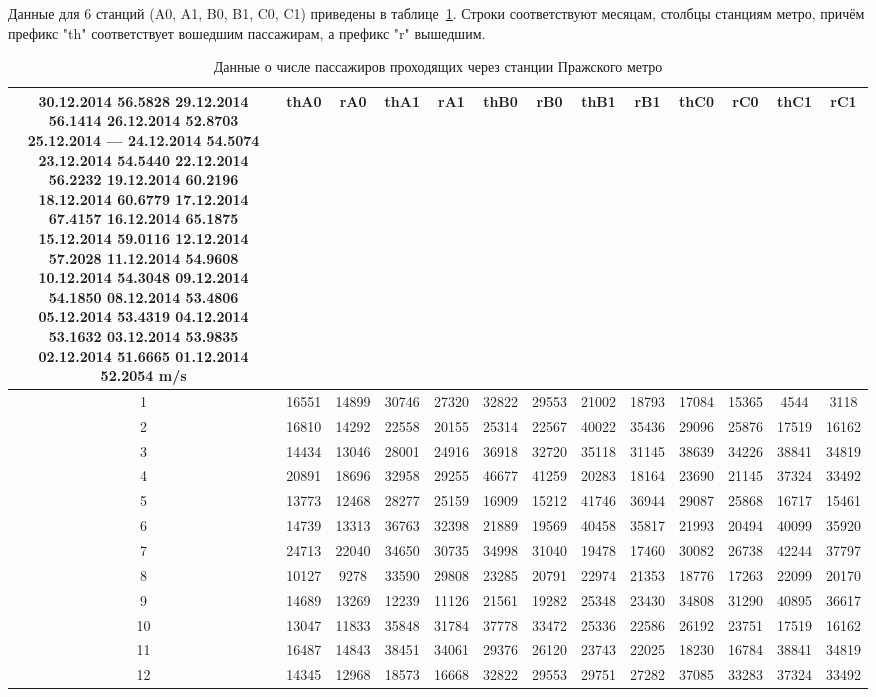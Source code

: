 \documentclass[12pt,a4paper,oneside]{extarticle}
\begin{document}
    Данные для 6 станций (A0, A1, B0, B1, C0, C1) приведены в таблице~\ref{tabular:data}. Строки соответствуют месяцам, столбцы станциям метро, причём префикс "th" \space соответствует вошедшим пассажирам, а префикс "r" \space вышедшим.
    \begin{table}[ht!]
        \caption{Данные о числе пассажиров проходящих через станции Пражского метро}
        \centering
        \label{tabular:data}
        \small
        \begin{tabular}{|c|c|c|c|c|c|c|c|c|c|c|c|c|}
        \hline
        30.12.2014 56.5828
        29.12.2014 56.1414
        26.12.2014 52.8703
        25.12.2014 —
        24.12.2014 54.5074
        23.12.2014 54.5440
        22.12.2014 56.2232
        19.12.2014 60.2196
        18.12.2014 60.6779
        17.12.2014 67.4157
        16.12.2014 65.1875
        15.12.2014 59.0116
        12.12.2014 57.2028
        11.12.2014 54.9608
        10.12.2014 54.3048
        09.12.2014 54.1850
        08.12.2014 53.4806
        05.12.2014 53.4319
        04.12.2014 53.1632
        03.12.2014 53.9835
        02.12.2014 51.6665
        01.12.2014 52.2054
        m/s & thA0 & rA0 & thA1 & rA1 & thB0 & rB0 & thB1 & rB1 & thC0 & rC0 & thC1 & rC1 \\ \hline
        1 & 16551 & 14899 & 30746 & 27320 & 32822 & 29553 & 21002 & 18793 & 17084 & 15365 & 4544 & 3118 \\ \hline
        2 & 16810 & 14292 & 22558 & 20155 & 25314 & 22567 & 40022 & 35436 & 29096 & 25876 & 17519 & 16162 \\ \hline
        3 & 14434 & 13046 & 28001 & 24916 & 36918 & 32720 & 35118 & 31145 & 38639 & 34226 & 38841 & 34819 \\ \hline
        4 & 20891 & 18696 & 32958 & 29255 & 46677 & 41259 & 20283 & 18164 & 23690 & 21145 & 37324 & 33492 \\ \hline
        5 & 13773 & 12468 & 28277 & 25159 & 16909 & 15212 & 41746 & 36944 & 29087 & 25868 & 16717 & 15461 \\ \hline
        6 & 14739 & 13313 & 36763 & 32398 & 21889 & 19569 & 40458 & 35817 & 21993 & 20494 & 40099 & 35920 \\ \hline
        7 & 24713 & 22040 & 34650 & 30735 & 34998 & 31040 & 19478 & 17460 & 30082 & 26738 & 42244 & 37797 \\ \hline
        8 & 10127 & 9278 & 33590 & 29808 & 23285 & 20791 & 22974 & 21353 & 18776 & 17263 & 22099 & 20170 \\ \hline
        9 & 14689 & 13269 & 12239 & 11126 & 21561 & 19282 & 25348 & 23430 & 34808 & 31290 & 40895 & 36617 \\ \hline
        10 & 13047 & 11833 & 35848 & 31784 & 37778 & 33472 & 25336 & 22586 & 26192 & 23751 & 17519 & 16162 \\ \hline
        11 & 16487 & 14843 & 38451 & 34061 & 29376 & 26120 & 23743 & 22025 & 18230 & 16784 & 38841 & 34819 \\ \hline
        12 & 14345 & 12968 & 18573 & 16668 & 32822 & 29553 & 29751 & 27282 & 37085 & 33283 & 37324 & 33492 \\ \hline
        \end{tabular}
    \end{table}
\end{document}
